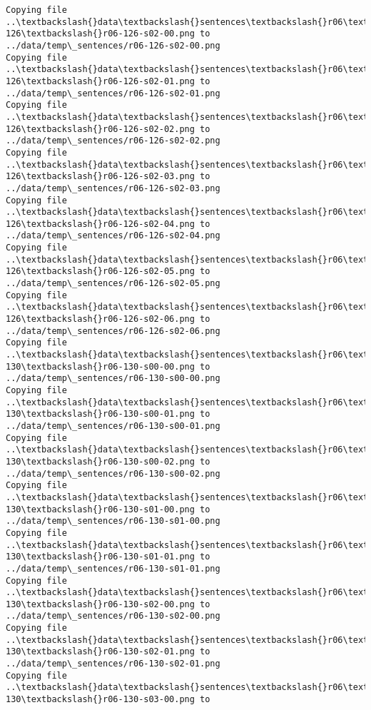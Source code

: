 \documentclass[11pt]{article}
\begin{document}
\begin{Verbatim}[commandchars=\\\{\}]
Copying file ..\textbackslash{}data\textbackslash{}sentences\textbackslash{}r06\textbackslash{}r06-126\textbackslash{}r06-126-s02-00.png to
../data/temp\_sentences/r06-126-s02-00.png
Copying file ..\textbackslash{}data\textbackslash{}sentences\textbackslash{}r06\textbackslash{}r06-126\textbackslash{}r06-126-s02-01.png to
../data/temp\_sentences/r06-126-s02-01.png
Copying file ..\textbackslash{}data\textbackslash{}sentences\textbackslash{}r06\textbackslash{}r06-126\textbackslash{}r06-126-s02-02.png to
../data/temp\_sentences/r06-126-s02-02.png
Copying file ..\textbackslash{}data\textbackslash{}sentences\textbackslash{}r06\textbackslash{}r06-126\textbackslash{}r06-126-s02-03.png to
../data/temp\_sentences/r06-126-s02-03.png
Copying file ..\textbackslash{}data\textbackslash{}sentences\textbackslash{}r06\textbackslash{}r06-126\textbackslash{}r06-126-s02-04.png to
../data/temp\_sentences/r06-126-s02-04.png
Copying file ..\textbackslash{}data\textbackslash{}sentences\textbackslash{}r06\textbackslash{}r06-126\textbackslash{}r06-126-s02-05.png to
../data/temp\_sentences/r06-126-s02-05.png
Copying file ..\textbackslash{}data\textbackslash{}sentences\textbackslash{}r06\textbackslash{}r06-126\textbackslash{}r06-126-s02-06.png to
../data/temp\_sentences/r06-126-s02-06.png
Copying file ..\textbackslash{}data\textbackslash{}sentences\textbackslash{}r06\textbackslash{}r06-130\textbackslash{}r06-130-s00-00.png to
../data/temp\_sentences/r06-130-s00-00.png
Copying file ..\textbackslash{}data\textbackslash{}sentences\textbackslash{}r06\textbackslash{}r06-130\textbackslash{}r06-130-s00-01.png to
../data/temp\_sentences/r06-130-s00-01.png
Copying file ..\textbackslash{}data\textbackslash{}sentences\textbackslash{}r06\textbackslash{}r06-130\textbackslash{}r06-130-s00-02.png to
../data/temp\_sentences/r06-130-s00-02.png
Copying file ..\textbackslash{}data\textbackslash{}sentences\textbackslash{}r06\textbackslash{}r06-130\textbackslash{}r06-130-s01-00.png to
../data/temp\_sentences/r06-130-s01-00.png
Copying file ..\textbackslash{}data\textbackslash{}sentences\textbackslash{}r06\textbackslash{}r06-130\textbackslash{}r06-130-s01-01.png to
../data/temp\_sentences/r06-130-s01-01.png
Copying file ..\textbackslash{}data\textbackslash{}sentences\textbackslash{}r06\textbackslash{}r06-130\textbackslash{}r06-130-s02-00.png to
../data/temp\_sentences/r06-130-s02-00.png
Copying file ..\textbackslash{}data\textbackslash{}sentences\textbackslash{}r06\textbackslash{}r06-130\textbackslash{}r06-130-s02-01.png to
../data/temp\_sentences/r06-130-s02-01.png
Copying file ..\textbackslash{}data\textbackslash{}sentences\textbackslash{}r06\textbackslash{}r06-130\textbackslash{}r06-130-s03-00.png to

\end{Verbatim}
\end{document}
